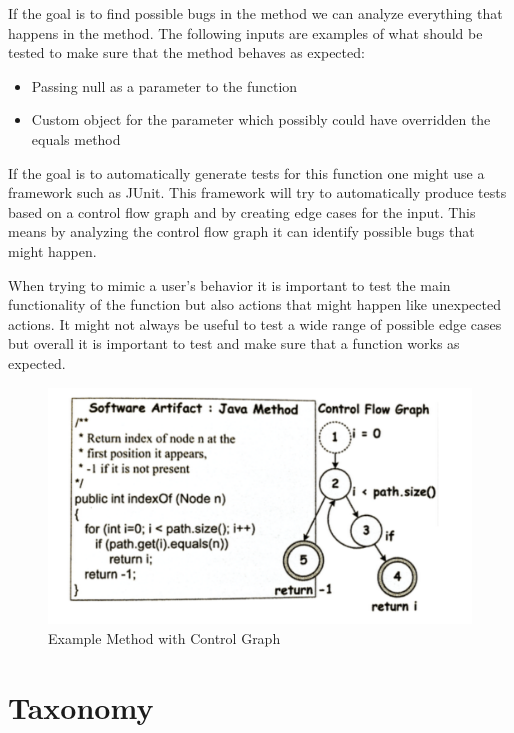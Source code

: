 \documentclass{article}
\begin{document}
If the goal is to find possible bugs in the method we can analyze everything that happens in the method. The following inputs are examples of what should be tested to make sure that the method behaves as expected:

\begin{itemize}
    \item Passing null as a parameter to the function
    \item Custom object for the parameter which possibly could have overridden the equals method
\end{itemize}

If the goal is to automatically generate tests for this function one might use a framework such as JUnit. This framework will try to automatically produce tests based on a control flow graph and by creating edge cases for the input. This means by analyzing the control flow graph it can identify possible bugs that might happen.

When trying to mimic a user's behavior it is important to test the main functionality of the function but also actions that might happen like unexpected actions. It might not always be useful to test a wide range of possible edge cases but overall it is important to test and make sure that a function works as expected.

\begin{figure}[H]
    \centering
    \includegraphics[width=\textwidth]{controlGraph.png}
    \caption{Example Method with Control Graph \cite{Lecture1}}
    \label{fig:graph}
\end{figure}

\section{Taxonomy}
\end{document}
